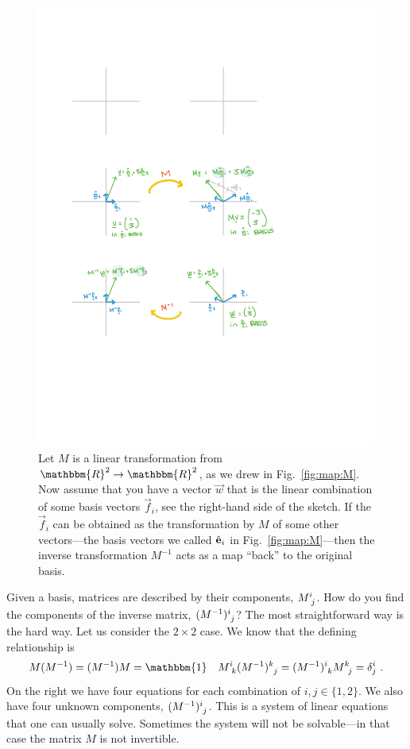 \documentclass[12pt]{article}
\begin{document}


\begin{figure}[tb]
    \centering
    \includegraphics[width=.8\textwidth]{figures/maps_Minv.pdf}
    \caption{Let $M$ is a linear transformation from $\mathbbm{R}^2 \to \mathbbm{R}^2$, as we drew in Fig.~\ref{fig:map:M}. Now assume that you have a vector $\vec{w}$ that is the linear combination of some basis vectors $\vec{f}_i$, see the right-hand side of the sketch. If the $\vec{f}_i$ can be obtained as the transformation by $M$ of some other vectors---the basis vectors we called $\hat{\mathbf{e}}_i$ in Fig.~\ref{fig:map:M}---then the inverse transformation $M^{-1}$ acts as a map ``back'' to the original basis. }
    \label{fig:map:M:inv}
\end{figure}

Given a basis, matrices are described by their components, $M\aij{i}{j}$. How do you find the components of the inverse matrix, $(M^{-1})\aij{i}{j}$? The most straightforward way is the hard way. Let us consider the $2\times 2$ case. We know that the defining relationship is
\begin{align}
    M(M^{-1})=(M^{-1})M &= \mathbbm{1}
    &
    M\aij{i}{k}(M^{-1})\aij{k}{j}
    =
    (M^{-1})\aij{i}{k}M\aij{k}{j} 
    = \delta^i_j \ .
    \label{eq:inverse:matrix:definition}
\end{align}
On the right we have four equations for each combination of $i,j \in\{1,2\}$. We also have four unknown components, $(M^{-1})\aij{i}{j}$. This is a system of linear equations that one can usually solve. Sometimes the system will not be solvable---in that case the matrix $M$ is not invertible.
\end{document}
